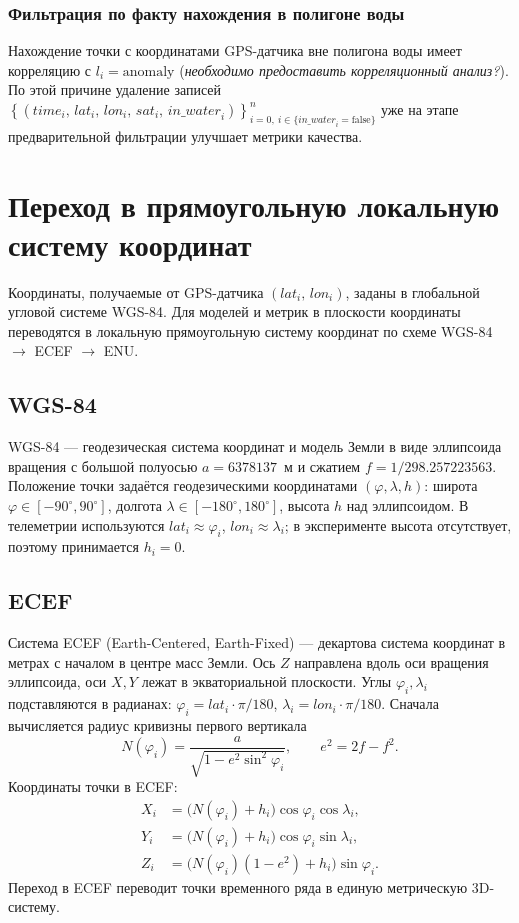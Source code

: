 \documentclass[a4paper,12pt]{report}
\begin{document}
	\subsubsection{Фильтрация по факту нахождения в полигоне воды}
	Нахождение точки с координатами GPS-датчика вне полигона воды имеет корреляцию с $l_i = \mathrm{anomaly}$ (\textit{необходимо предоставить корреляционный анализ?}). По этой причине удаление записей $\left\{\left(\mathit{time}_i,\, \mathit{lat}_i,\, \mathit{lon}_i,\, \mathit{sat}_i,\, \mathit{in\_water}_i\right) \right\}_{i=0,\ i \in \{\mathit{in\_water}_i = \mathrm{false}\}}^{n}$ уже на этапе предварительной фильтрации улучшает метрики качества.

	\section{Переход в прямоугольную локальную систему координат}
	Координаты, получаемые от GPS-датчика $(\mathit{lat}_i,\, \mathit{lon}_i)$, заданы в глобальной угловой системе WGS-84. Для моделей и метрик в плоскости координаты переводятся в локальную прямоугольную систему координат по схеме WGS-84 $\to$ ECEF $\to$ ENU.

	\subsection{WGS-84}
	WGS-84 --- геодезическая система координат и модель Земли в виде эллипсоида вращения с большой полуосью $a=6378137$~м и сжатием $f=1/298.257223563$. Положение точки задаётся геодезическими координатами $(\varphi, \lambda, h)$: широта $\varphi \in [-90^\circ,90^\circ]$, долгота $\lambda \in [-180^\circ,180^\circ]$, высота $h$ над эллипсоидом. В телеметрии используются $\mathit{lat}_i \approx \varphi_i$, $\mathit{lon}_i \approx \lambda_i$; в эксперименте высота отсутствует, поэтому принимается $h_i = 0$.

	\subsection{ECEF}
	Система ECEF (Earth-Centered, Earth-Fixed) --- декартова система координат в метрах с началом в центре масс Земли. Ось $Z$ направлена вдоль оси вращения эллипсоида, оси $X,Y$ лежат в экваториальной плоскости. Углы $\varphi_i, \lambda_i$ подставляются в радианах: $\varphi_i = \mathit{lat}_i \cdot \pi/180$, $\lambda_i = \mathit{lon}_i \cdot \pi/180$. Сначала вычисляется радиус кривизны первого вертикала
	\begin{equation*}
		N(\varphi_i)=\frac{a}{\sqrt{1-e^2\sin^2\varphi_i}}, \qquad e^2 = 2f - f^2.
	\end{equation*}
	Координаты точки в ECEF:
	\begin{align*}
		X_i &= \bigl(N(\varphi_i)+h_i\bigr)\cos\varphi_i\cos\lambda_i,\\
		Y_i &= \bigl(N(\varphi_i)+h_i\bigr)\cos\varphi_i\sin\lambda_i,\\
		Z_i &= \bigl(N(\varphi_i)(1-e^2)+h_i\bigr)\sin\varphi_i.
	\end{align*}
	Переход в ECEF переводит точки временного ряда в единую метрическую 3D-систему.
\end{document}
